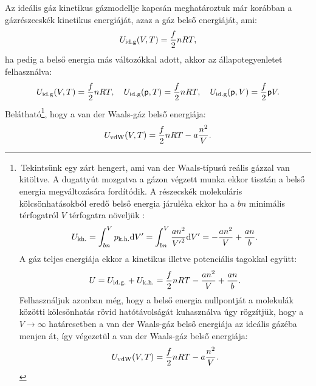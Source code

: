 Az ideális gáz kinetikus gázmodellje kapcsán meghatároztuk már korábban a gázrészecskék kinetikus energiáját, azaz a gáz belső energiáját, ami:
\begin{align}
    U_{\textnormal{id.g}}(V,T) = \frac f2 nRT,
\end{align}
ha pedig a belső energia más változókkal adott, akkor az állapotegyenletet felhasználva:
\begin{align}
    U_{\textnormal{id.g}}(V,T) = \frac f2 nRT,\quad U_{\textnormal{id.g}}(\mathsf p,T) = \frac f2 nRT,\quad  U_{\textnormal{id.g}}(\mathsf p,V) = \frac f2 \mathsf p V.
\end{align}
Belátható\footnote{\,Tekintsünk egy zárt hengert, ami van der Waals-típusú reális gázzal van kitöltve. A dugattyút mozgatva a gázon végzett munka ekkor tisztán a belső energia megváltozására fordítódik. A részecskék molekuláris kölcsönhatásokból eredő belső energia járuléka ekkor ha a $bn$ minimális térfogatról $V$ térfogatra növeljük :$$U_{\textnormal{kh.}} = \int_{bn}^V p_{\textnormal{k.h.}}\mathrm{d}V' = \int_{bn}^V \frac{an^2}{{V'}^2}\mathrm{d}V' = -\frac{an^2}{V}+\frac{an}{b}.$$
A gáz teljes energiája ekkor a kinetikus illetve potenciális tagokkal együtt:
$$U = U_{\textnormal{id.g.}} + U_{\textnormal{k.h.}} = \frac f2 nRT -\frac{an^2}{V}+\frac{an}{b}.$$
Felhasználjuk azonban még, hogy a belső energia nullpontját a molekulák közötti kölcsönhatás rövid hatótávolságát kuhasználva úgy rögzítjük, hogy a $V\to\infty$ határesetben a van der Waals-gáz belső energiája az ideális gázéba menjen át, így végezetül a van der Waals-gáz belső energiája:
\begin{align}
    U_{\textnormal{vdW}}(V,T) = \frac f2 nRT - a\frac{n^2}{V}.
\end{align}}, hogy a van der Waals-gáz belső energiája:
\begin{align}
    U_{\textnormal{vdW}}(V,T) = \frac f2 nRT - a\frac{n^2}{V}.
\end{align}

